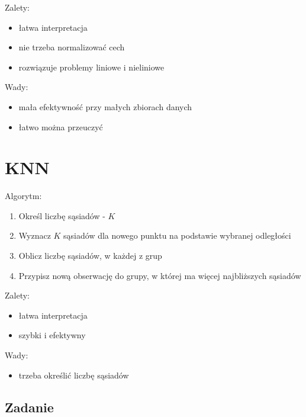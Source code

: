 \documentclass[]{book}
\providecommand{\tightlist}{%
  \setlength{\itemsep}{0pt}\setlength{\parskip}{0pt}}
\begin{document}
Zalety:

\begin{itemize}
\tightlist
\item
  łatwa interpretacja
\item
  nie trzeba normalizować cech
\item
  rozwiązuje problemy liniowe i nieliniowe
\end{itemize}

Wady:

\begin{itemize}
\tightlist
\item
  mała efektywność przy małych zbiorach danych
\item
  łatwo można przeuczyć
\end{itemize}

\hypertarget{knn}{%
\section{KNN}\label{knn}}

Algorytm:

\begin{enumerate}
\def\labelenumi{\arabic{enumi}.}
\tightlist
\item
  Określ liczbę sąsiadów - \(K\)
\item
  Wyznacz \(K\) sąsiadów dla nowego punktu na podstawie wybranej odległości
\item
  Oblicz liczbę sąsiadów, w każdej z grup
\item
  Przypisz nową obserwację do grupy, w której ma więcej najbliższych sąsiadów
\end{enumerate}

Zalety:

\begin{itemize}
\tightlist
\item
  łatwa interpretacja
\item
  szybki i efektywny
\end{itemize}

Wady:

\begin{itemize}
\tightlist
\item
  trzeba określić liczbę sąsiadów
\end{itemize}

\hypertarget{zadanie-2}{%
\subsection{Zadanie}\label{zadanie-2}}
\end{document}
